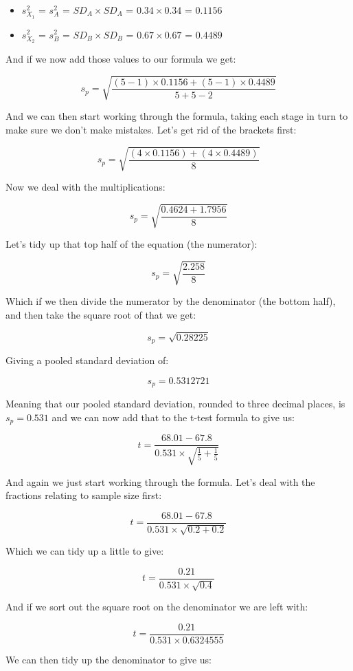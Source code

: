 \documentclass[
  oneside]{book}
\providecommand{\tightlist}{%
  \setlength{\itemsep}{0pt}\setlength{\parskip}{0pt}}
\begin{document}
\begin{itemize}
\tightlist
\item
  \(s^2_{X_1}\) = \(s^2_A\) = \(SD_A \times SD_A\) = \(0.34 \times 0.34\) = \(0.1156\)
\item
  \(s^2_{X_2}\) = \(s^2_B\) = \(SD_B \times SD_B\) = \(0.67 \times 0.67\) = \(0.4489\)
\end{itemize}

And if we now add those values to our formula we get:

\[s_p = \sqrt{\frac{(5 -1)  \times 0.1156 + (5 -1)\times 0.4489}{5 + 5 - 2}}\]

And we can then start working through the formula, taking each stage in turn to make sure we don't make mistakes. Let's get rid of the brackets first:

\[s_p = \sqrt{\frac{(4  \times 0.1156) + (4 \times 0.4489)}{8}}\]

Now we deal with the multiplications:

\[s_p = \sqrt{\frac{0.4624 + 1.7956}{8}}\]

Let's tidy up that top half of the equation (the numerator):

\[s_p = \sqrt{\frac{2.258}{8}}\]

Which if we then divide the numerator by the denominator (the bottom half), and then take the square root of that we get:

\[s_p = \sqrt{0.28225}\]

Giving a pooled standard deviation of:

\[s_p = 0.5312721\]

Meaning that our pooled standard deviation, rounded to three decimal places, is \(s_p = 0.531\) and we can now add that to the t-test formula to give us:

\[t = \frac{68.01 - 67.8}{0.531 \times \sqrt{\frac{1}{5} + \frac{1}{5}}}\]

And again we just start working through the formula. Let's deal with the fractions relating to sample size first:

\[t = \frac{68.01 - 67.8}{0.531 \times \sqrt{0.2 + 0.2}}\]

Which we can tidy up a little to give:

\[t = \frac{0.21}{0.531 \times \sqrt{0.4}}\]

And if we sort out the square root on the denominator we are left with:

\[t = \frac{0.21}{0.531 \times 0.6324555}\]

We can then tidy up the denominator to give us:
\end{document}
